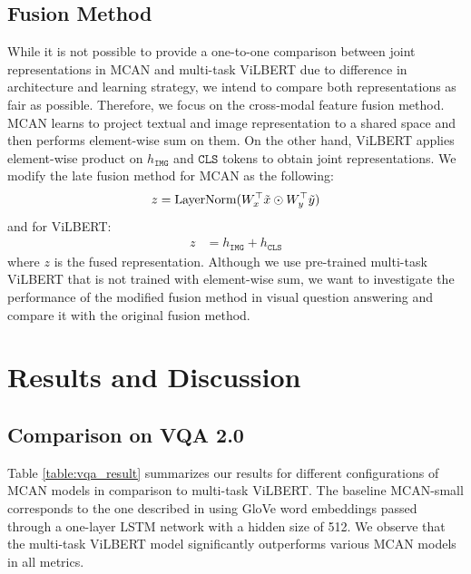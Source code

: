 \documentclass{article}
\begin{document}


\subsection{Fusion Method}
While it is not possible to provide a one-to-one comparison between joint representations in MCAN and multi-task ViLBERT due to difference in architecture and learning strategy, we intend to compare both representations as fair as possible. Therefore, we focus on the cross-modal feature fusion method. MCAN learns to project textual and image representation to a shared space and then performs element-wise sum on them. On the other hand, ViLBERT applies element-wise product on $h_{\mathtt{IMG}}$ and $\mathtt{CLS}$ tokens to obtain joint representations. We modify the late fusion method for MCAN as the following:
\begin{align}
    z &= \text{LayerNorm}(W^{\top}_{x}\Tilde{x} \odot W^{\top}_{y}\Tilde{y}) \\
\end{align}
and for ViLBERT:
\begin{align}
    z &= h_{\mathtt{IMG}} + h_{\mathtt{CLS}}
\end{align}
where $z$ is the fused representation. Although we use pre-trained multi-task ViLBERT that is not trained with element-wise sum, we want to investigate the performance of the modified fusion method in visual question answering and compare it with the original fusion method. 

\section{Results and Discussion}
\subsection{Comparison on VQA 2.0} \label{comp_vqa}
Table \ref{table:vqa_result} summarizes our results for different configurations of MCAN models in comparison to multi-task ViLBERT. The baseline MCAN-small corresponds to the one described in \citet{yu2019mcan} using GloVe word embeddings passed through a one-layer LSTM network with a hidden size of 512. We observe that the multi-task ViLBERT model significantly outperforms various MCAN models in all metrics.
\end{document}
